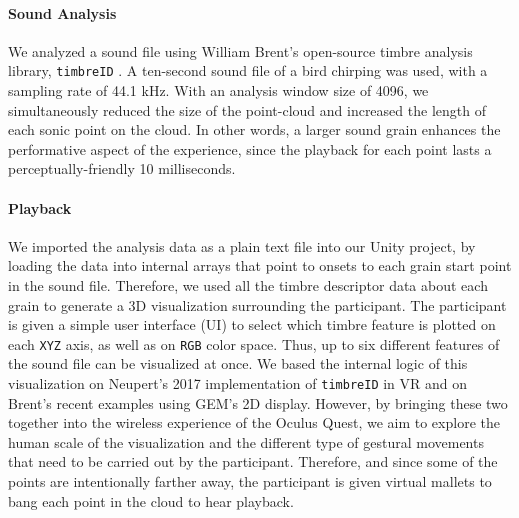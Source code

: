 \documentclass{nime-alternate}
\begin{document}
\paragraph{Sound Analysis} We analyzed a sound file using William Brent's open-source timbre analysis library, \texttt{timbreID} \cite{icmc/bbp2372.2010.044}. A ten-second sound file of a bird chirping was used, with a sampling rate of 44.1 kHz. With an analysis window size of 4096, we simultaneously reduced the size of the point-cloud and increased the length of each sonic point on the cloud. In other words, a larger sound grain enhances the performative aspect of the experience, since the playback for each point lasts a perceptually-friendly 10 milliseconds.

\paragraph{Playback}

We imported the analysis data as a plain text file into our Unity project, by loading the data into internal arrays that point to onsets to each grain start point in the sound file. Therefore, we used all the timbre descriptor data about each grain to generate a 3D visualization surrounding the participant. The participant is given a simple user interface (UI) to select which timbre feature is plotted on each \texttt{XYZ} axis, as well as on \texttt{RGB} color space. Thus, up to six different features of the sound file can be visualized at once. We based the internal logic of this visualization on Neupert's 2017 implementation of \texttt{timbreID} in VR and on Brent's recent examples using GEM's 2D display. However, by bringing these two together into the wireless experience of the Oculus Quest, we aim to explore the human scale of the visualization and the different type of gestural movements that need to be carried out by the participant. Therefore, and since some of the points are intentionally farther away, the participant is given virtual mallets to bang each point in the cloud to hear playback.
\end{document}
